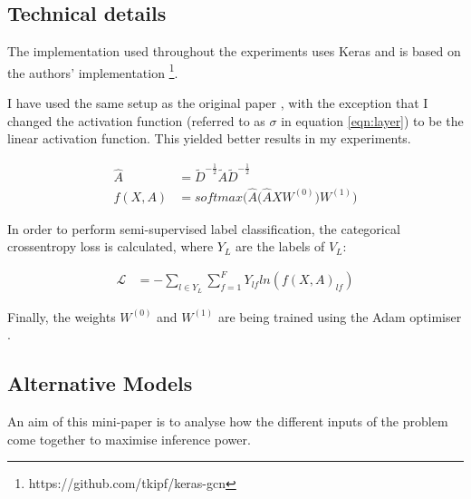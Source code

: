 \documentclass[10pt,a4]{article}
\begin{document}
    \subsection{Technical details}

    The implementation used throughout the experiments uses Keras \cite{chollet2015} 
    and is based on the authors' implementation \footnote{https://github.com/tkipf/keras-gcn}.

    I have used the same setup as the original paper \cite{kipf2016semi}, with 
    the exception that I changed the activation function (referred to as $\sigma$
    in equation \ref{eqn:layer}) to be the linear activation function. This yielded
    better results in my experiments.
    
    \begin{align}
        \hat{A} &= \tilde{D}^{-\frac{1}{2}} \tilde{A} \tilde{D}^{-\frac{1}{2}} \\
        \label{eqn:kipfmodel}
        f(X, A) &= softmax\Big(\hat{A}\big(\hat{A}XW^{(0)}\big)W^{(1)}\Big)
    \end{align}

    In order to perform semi-supervised label classification, the categorical
    cross\-entropy loss is calculated, where $Y_L$ are the labels of $V_L$:

    \begin{align*}
        \mathcal{L} &= - \sum_{l\in Y_L}\sum_{f=1}^F Y_{lf}ln(f(X,A)_{lf})
    \end{align*}

    Finally, the weights $W^{(0)}$ and $W^{(1)}$ are being trained using the Adam
    optimiser \cite{kingma2014adam}. 

    \subsection{Alternative Models}

    An aim of this mini-paper is to analyse how the different inputs of the 
    problem come together to maximise inference power.
    
\end{document}
